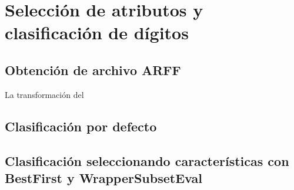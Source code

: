 \section{Selecci\'on de atributos y clasificaci\'on de d\'igitos}

\subsection{Obtenci\'on de archivo ARFF}
La transformaci\'on del 


\subsection{Clasificaci\'on por defecto}


\subsection{Clasificaci\'on seleccionando caracter\'isticas con BestFirst y WrapperSubsetEval}
